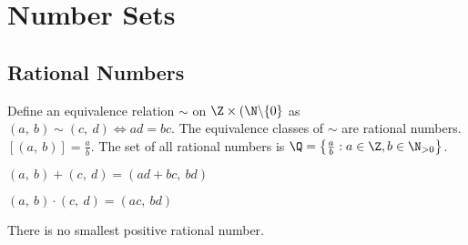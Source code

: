 \documentclass{article}
\begin{document}
\section{Number Sets}
\subsection{Rational Numbers}
\begin{definition}
    Define an equivalence relation \(\sim\) on \(\Z \times (\N\backslash\{0\}\)
    as \((a,\: b) \sim (c,\: d) \iff ad=bc\).
    The equivalence classes of \(\sim\) are rational numbers.
    \([(a,\: b)] = \frac{a}{b}\).
    The set of all rational numbers is
    \(\Q = \left\{ \frac{a}{b} : a\in \Z, b\in \N_{>0} \right\}\).
\end{definition}
%
\begin{definition}
    \((a,\: b) + (c,\: d) = (ad+bc,\: bd)\)
\end{definition}
%
\begin{definition}
    \((a,\: b) \cdot (c,\: d) = (ac,\: bd)\)
\end{definition}
\begin{theorem}
    There is no smallest positive rational number.
\end{theorem}
%
\end{document}
